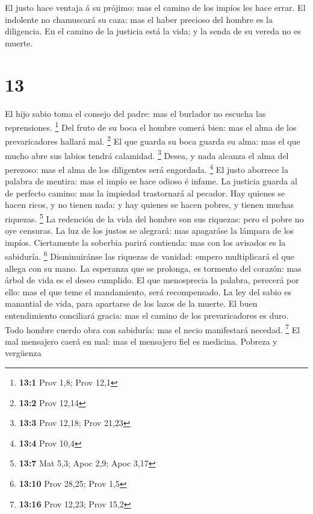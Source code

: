  El justo hace ventaja á su prójimo: mas el camino de los
impíos les hace errar.  El indolente no chamuscará su caza:
mas el haber precioso del hombre es la diligencia.  En el
camino de la justicia está la vida; y la senda de su vereda no es
muerte.

\hypertarget{section-12}{%
\section{13}\label{section-12}}

 El hijo sabio toma el consejo del padre: mas el burlador no
escucha las reprensiones. \footnote{\textbf{13:1} Prov 1,8; Prov 12,1}
 Del fruto de su boca el hombre comerá bien: mas el alma de
los prevaricadores hallará mal. \footnote{\textbf{13:2} Prov 12,14}
 El que guarda su boca guarda su alma: mas el que mucho abre
sus labios tendrá calamidad. \footnote{\textbf{13:3} Prov 12,18; Prov
  21,23}  Desea, y nada alcanza el alma del perezoso: mas el
alma de los diligentes será engordada. \footnote{\textbf{13:4} Prov 10,4}
 El justo aborrece la palabra de mentira: mas el impío se
hace odioso é infame.  La justicia guarda al de perfecto
camino: mas la impiedad trastornará al pecador.  Hay quienes
se hacen ricos, y no tienen nada: y hay quienes se hacen pobres, y
tienen muchas riquezas. \footnote{\textbf{13:7} Mat 5,3; Apoc 2,9; Apoc
  3,17}  La redención de la vida del hombre son sus
riquezas: pero el pobre no oye censuras.  La luz de los
justos se alegrará: mas apagaráse la lámpara de los impíos.
 Ciertamente la soberbia parirá contienda: mas con los
avisados es la sabiduría. \footnote{\textbf{13:10} Prov 28,25; Prov 1,5}
 Disminuiránse las riquezas de vanidad: empero multiplicará
el que allega con su mano.  La esperanza que se prolonga,
es tormento del corazón: mas árbol de vida es el deseo cumplido.
 El que menosprecia la palabra, perecerá por ello: mas el
que teme el mandamiento, será recompensado.  La ley del
sabio es manantial de vida, para apartarse de los lazos de la muerte.
 El buen entendimiento conciliará gracia: mas el camino de
los prevaricadores es duro.  Todo hombre cuerdo obra con
sabiduría: mas el necio manifestará necedad. \footnote{\textbf{13:16}
  Prov 12,23; Prov 15,2}  El mal mensajero caerá en mal:
mas el mensajero fiel es medicina.  Pobreza y vergüenza
